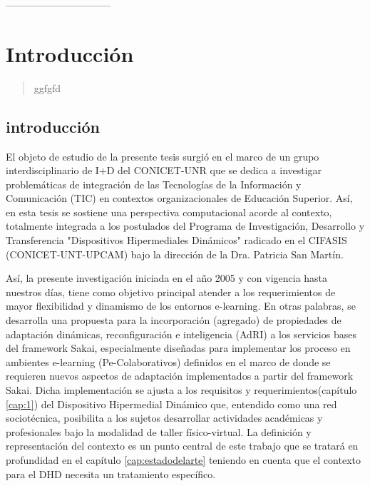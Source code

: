 --------------------------------
\parskip=0.6cm

\chapter{Introducción}\label{cap:Introduccion} 


\begin{abstract}
ggfgfd

\end{abstract}


\section{introducción}

El objeto de estudio de la presente tesis surgió en el marco de un grupo interdisciplinario de I+D del CONICET-UNR que se dedica a investigar problemáticas de integración de las Tecnologías de la Información y Comunicación (TIC) en contextos organizacionales de Educación Superior. Así, en esta tesis se sostiene una perspectiva computacional acorde al contexto, totalmente integrada a los postulados del Programa de Investigación, Desarrollo y Transferencia "Dispositivos Hipermediales Dinámicos" radicado en el CIFASIS (CONICET-UNT-UPCAM) bajo la dirección de la Dra. Patricia San Martín.

Así, la presente investigación iniciada en el año 2005 y con vigencia hasta nuestros días, tiene como objetivo principal atender a los requerimientos de mayor flexibilidad y dinamismo de los entornos e-learning. En otras palabras, se desarrolla una propuesta para la incorporación (agregado) de propiedades de adaptación dinámicas, reconfiguración e inteligencia (AdRI) \label{AdRI} a los servicios bases del framework Sakai,
especialmente diseñadas para implementar los proceso en ambientes e-learning (Pe-Colaborativos) definidos en el marco de \cite{cacic2007.9} donde se requieren nuevos aspectos de adaptación \cite{librounq} implementados a partir del framework Sakai. Dicha
implementación se ajusta a los requisitos y requerimientos(capítulo \ref{cap:1}) del Dispositivo Hipermedial Dinámico que, entendido como una red sociotécnica, posibilita a los sujetos desarrollar actividades académicas y profesionales bajo la modalidad de taller físico-virtual. 
La definición y representación del
contexto es un punto central de este trabajo que se tratará en profundidad en el
capítulo \ref{cap:estadodelarte} teniendo en cuenta que el contexto para el DHD necesita un
tratamiento específico.

